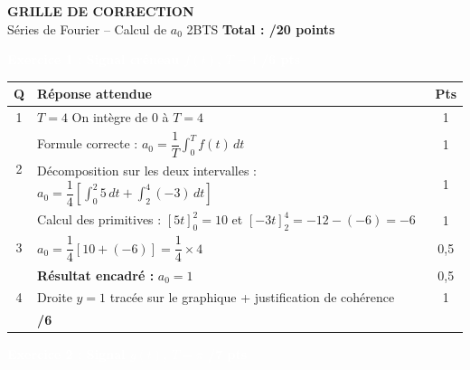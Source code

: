 \documentclass[10pt,a4paper]{article}
\newcommand{\exotitle}[2]{%
  \noindent\colorbox{exoheader}{%
    \parbox{\dimexpr\linewidth-2\fboxsep\relax}{%
      \textcolor{white}{\textbf{\large #1 \hfill #2}}%
    }%
  }%
}
\begin{document}
\begin{center}
	{\LARGE\textbf{GRILLE DE CORRECTION}}\\[1mm]
	{\large Séries de Fourier -- Calcul de $a_0$ \hspace{1cm} 2BTS \hspace{1cm} \textbf{Total : /20 points}}
\end{center}

\vspace{2mm}

\exotitle{Exercice 1 : Signal créneau $f(t)$, $T = 4$}{/6 pts}

\vspace{1mm}

\begin{tabularx}{\linewidth}{|c|X|c|}
	\hline
	\rowcolor{exolight}
	\textbf{Q} & \textbf{Réponse attendue} & \textbf{Pts} \\
	\hline
	1 & $T = 4$ \quad On intègre de $0$ à $T = 4$ & 1 \\
	\hline
	\multirow{2}{*}{2} & Formule correcte : $a_0 = \dfrac{1}{T}\displaystyle\int_0^T f(t)\,dt$ & 1 \\
	\cline{2-3}
	& Décomposition sur les deux intervalles : $a_0 = \dfrac{1}{4}\left[\displaystyle\int_0^2 5\,dt + \int_2^4 (-3)\,dt\right]$ & 1 \\
	\hline
	\multirow{3}{*}{3} & Calcul des primitives : $\left[5t\right]_0^2 = 10$ \quad et \quad $\left[-3t\right]_2^4 = -12-(-6) = -6$ & 1 \\
	\cline{2-3}
	& $a_0 = \dfrac{1}{4}\left[10 + (-6)\right] = \dfrac{1}{4} \times 4$ & 0,5 \\
	\cline{2-3}
	& \textbf{Résultat encadré :} $a_0 = 1$ & 0,5 \\
	\hline
	4 & Droite $y = 1$ tracée sur le graphique \quad + \quad justification de cohérence & 1 \\
	\hline
	\rowcolor{totalrow}
	\multicolumn{2}{|r|}{\textbf{Sous-total Exercice 1}} & \textbf{/6} \\
	\hline
\end{tabularx}

\vspace{3mm}

\exotitle{Exercice 2 : Signal $g(t)$, $T = \pi$}{/7 pts}

\vspace{1mm}
\end{document}
